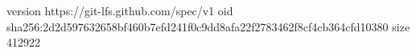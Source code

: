 version https://git-lfs.github.com/spec/v1
oid sha256:2d2d597632658bf460b7efd241f0c9dd8afa22f2783462f8cf4cb364cfd10380
size 412922
